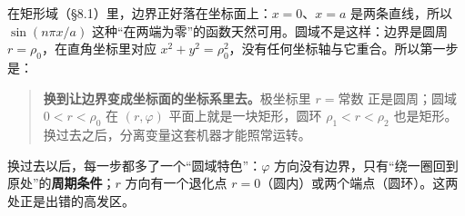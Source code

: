\documentclass[11pt]{ctexart}
\let\orighdr\hdr
\renewcommand{\hdr}[2]{\par\needspace{6\baselineskip}\orighdr{#1}{#2}}
\begin{document}
\label{sec:s0}

在矩形域（\S8.1）里，边界正好落在坐标面上：$x=0$、$x=a$ 是两条直线，所以 $\sin(n\pi x/a)$ 这种“在两端为零”的函数天然可用。圆域不是这样：边界是圆周 $r=\rho_0$，在直角坐标里对应 $x^2+y^2=\rho_0^2$，没有任何坐标轴与它重合。所以第一步是：

\begin{quote}
\textbf{换到让边界变成坐标面的坐标系里去。}极坐标里 $r=\text{常数}$ 正是圆周；圆域 $0<r<\rho_0$ 在 $(r,\varphi)$ 平面上就是一块矩形，圆环 $\rho_1<r<\rho_2$ 也是矩形。换过去之后，分离变量这套机器才能照常运转。
\end{quote}

换过去以后，每一步都多了一个“圆域特色”：$\varphi$ 方向没有边界，只有“绕一圈回到原处”的\textbf{周期条件}；$r$ 方向有一个退化点 $r=0$（圆内）或两个端点（圆环）。这两处正是出错的高发区。
\end{document}
